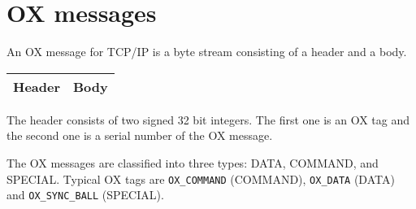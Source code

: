 
\section{OX messages}

An OX message for TCP/IP is a byte stream consisting of
a header and a body.
\begin{center}
\begin{tabular}{|c|c|}
\hline
Header	& \hspace{10mm} Body \hspace{10mm} \\
\hline
\end{tabular}
\end{center}
The header consists of two signed 32 bit integers.
The first one is an OX tag 
and the second one is a serial number of the OX message.


The OX messages are classified into three types:
DATA, COMMAND, and SPECIAL.
Typical OX tags are 
\verb+OX_COMMAND+ (COMMAND), \verb+OX_DATA+ (DATA) and \verb+OX_SYNC_BALL+ (SPECIAL).



%
